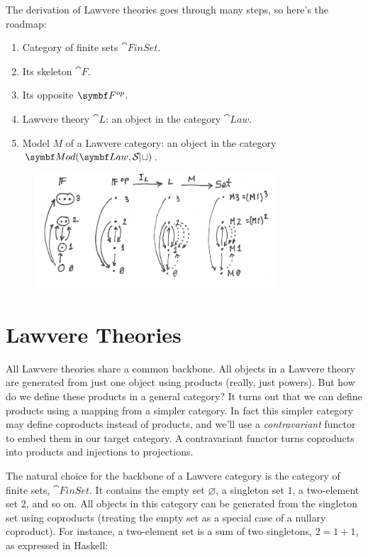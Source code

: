 The derivation of Lawvere theories goes through many steps, so here's
the roadmap:

\begin{enumerate}
\tightlist
\item
  Category of finite sets $\cat{FinSet}$.
\item
  Its skeleton $\cat{F}$.
\item
  Its opposite $\Fop$.
\item
  Lawvere theory $\cat{L}$: an object in the category $\cat{Law}$.
\item
  Model $M$ of a Lawvere category: an object in the category\\
  $\cat{Mod}(\cat{Law}, \Set)$.
\end{enumerate}

\begin{figure}[H]
\centering
\includegraphics[width=0.8\textwidth]{images/lawvere1.png}
\end{figure}

\section{Lawvere Theories}

All Lawvere theories share a common backbone. All objects in a Lawvere
theory are generated from just one object using products (really, just
powers). But how do we define these products in a general category? It
turns out that we can define products using a mapping from a simpler
category. In fact this simpler category may define coproducts instead of
products, and we'll use a \emph{contravariant} functor to embed them in
our target category. A contravariant functor turns coproducts into
products and injections to projections.

The natural choice for the backbone of a Lawvere category is the
category of finite sets, $\cat{FinSet}$. It contains the empty set
$\varnothing$, a singleton set $1$, a two-element set $2$,
and so on. All objects in this category can be generated from the
singleton set using coproducts (treating the empty set as a special case
of a nullary coproduct). For instance, a two-element set is a sum of two
singletons, $2 = 1 + 1$, as expressed in Haskell:

